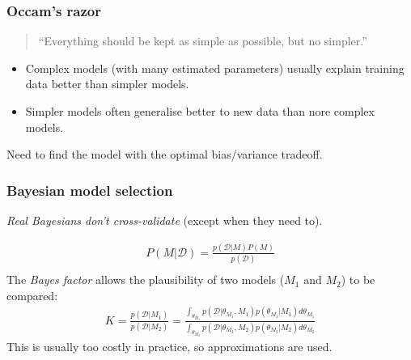 
\begin{frame}
\frametitle{Occam's razor}
\begin{quote}
``Everything should be kept as simple as possible, but no simpler.''
\par {}
\end{quote}
\vspace{0.25cm}
\begin{itemize}
\item Complex models (with many estimated parameters) usually explain training data better than simpler models.\par
\item Simpler models often generalise better to new data than nore complex models.\par
\end{itemize}
Need to find the model with the optimal bias/variance tradeoff.\par
\end{frame}

\begin{frame}
\frametitle{Bayesian model selection}
\emph{Real Bayesians don't cross-validate} (except when they need to).\par
\begin{align*}
P(M|\mathcal{D}) = \frac{p(\mathcal{D}|M) P(M)}{p(\mathcal{D})}\\
\end{align*}
The \emph{Bayes factor} allows the plausibility of two models ($M_1$ and $M_2$) to be compared:
\begin{align*}
K = \frac{p(\mathcal{D}|M_1)}{p(\mathcal{D}|M_2)} =
    \frac{\int_{\theta_{M_1}} p(\mathcal{D}|\theta_{M_1},M_1) p(\theta_{M_1}|M_1) d{\theta}_{M_1}}
         {\int_{\theta_{M_2}} p(\mathcal{D}|\theta_{M_2},M_2) p(\theta_{M_2}|M_2) d{\theta}_{M_2}}
\end{align*}
This is usually too costly in practice, so approximations are used.
\end{frame}

